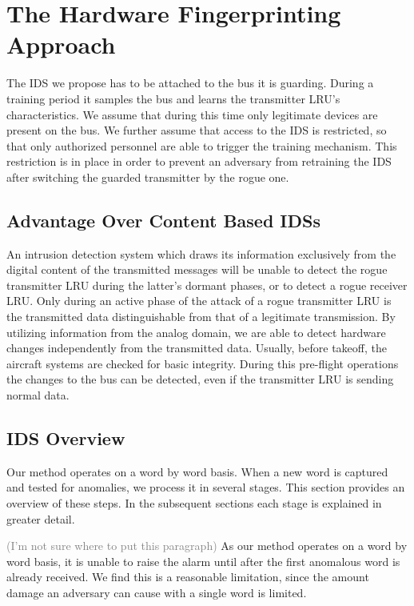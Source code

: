 \documentclass[conference]{IEEEtran}
\begin{document}
\section{The Hardware Fingerprinting Approach}
  The IDS we propose has to be attached to the bus it is guarding. During a training period it samples the bus and learns the transmitter LRU's characteristics. We assume that during this time only legitimate devices are present on the bus. We further assume that access to the IDS is restricted, so that only authorized personnel are able to trigger the training mechanism. This restriction is in place in order to prevent an adversary from retraining the IDS after switching the guarded transmitter by the rogue one.
  
\subsection{Advantage Over Content Based IDSs}
  An intrusion detection system which draws its information exclusively from the digital content of the transmitted messages will be unable to detect the rogue transmitter LRU during the latter's dormant phases, or to detect a rogue receiver LRU. Only during an active phase of the attack of a rogue transmitter LRU is the transmitted data distinguishable from that of a legitimate transmission. By utilizing information from the analog domain, we are able to detect hardware changes independently from the transmitted data.  Usually, before takeoff, the aircraft systems are checked for basic integrity. During this pre-flight operations the changes to the bus can be detected, even if the transmitter LRU is sending normal data.
  
\subsection{IDS Overview} \label{Overview}
  Our method operates on a word by word basis. When a new word is captured and tested for anomalies, we process it in several stages. This section provides an overview of these steps. In the subsequent sections each stage is explained in greater detail.
  
  \textcolor{gray}{(I'm not sure where to put this paragraph)}
  As our method operates on a word by word basis, it is unable to raise the alarm until after the first anomalous word is already received. We find this is a reasonable limitation, since the amount damage an adversary can cause with a single word is limited. 
  
\end{document}

